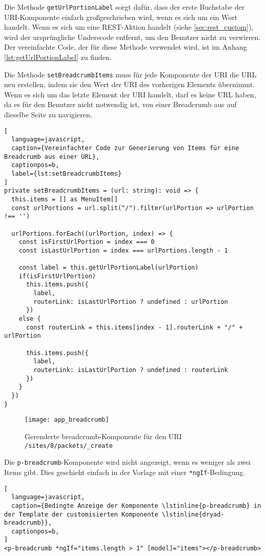 Die Methode \lstinline{getUrlPortionLabel} sorgt dafür, dass der erste Buchstabe der \ac{URI}-Komponente einfach großgeschrieben wird, wenn es sich um ein Wort handelt.
Wenn es sich um eine \ac{REST}-Aktion handelt (siehe \ref{sec:rest_custom}), wird der ursprüngliche Underscode entfernt, um den Benutzer nicht zu verwirren.
Der vereinfachte Code, der für diese Methode verwendet wird, ist im Anhang \ref{lst:getUrlPortionLabel} zu finden.

Die Methode \lstinline{setBreadcrumbItems} muss für jede Komponente der \ac{URI} die \ac{URL} neu erstellen, indem sie den Wert der \ac{URI} des vorherigen Elements übernimmt.
Wenn es sich um das letzte Element der \ac{URI} handelt, darf es keine \ac{URL} haben, da es für den Benutzer nicht notwendig ist, von einer Breadcrumb aus auf dieselbe Seite zu navigieren.

\begin{lstlisting}[
  language=javascript,
  caption={Vereinfachter Code zur Generierung von Items für eine Breadcrumb aus einer URL},
  captionpos=b,
  label={lst:setBreadcrumbItems}
]
private setBreadcrumbItems = (url: string): void => {
  this.items = [] as MenuItem[]
  const urlPortions = url.split("/").filter(urlPortion => urlPortion !== '')

  urlPortions.forEach((urlPortion, index) => {
    const isFirstUrlPortion = index === 0
    const isLastUrlPortion = index === urlPortions.length - 1

    const label = this.getUrlPortionLabel(urlPortion)
    if(isFirstUrlPortion)
      this.items.push({
        label,
        routerLink: isLastUrlPortion ? undefined : urlPortion
      })
    else {
      const routerLink = this.items[index - 1].routerLink + "/" + urlPortion

      this.items.push({
        label,
        routerLink: isLastUrlPortion ? undefined : routerLink
      })
    }
  })
}
\end{lstlisting}

\begin{figure}[H]
  \centering
  \texttt{[image: app\_breadcrumb]}
  \caption{Gerenderte breadcrumb-Komponente für den URI \lstinline{/sites/8/packets/_create}}
  \label{fig:app_breadcrumb}
\end{figure}

Die \lstinline{p-breadcrumb}-Komponente wird nicht angezeigt, wenn es weniger als zwei Items gibt.
Dies geschieht einfach in der Vorlage mit einer \lstinline{*ngIf}-Bedingung.

\begin{lstlisting}[
  language=javascript,
  caption={Bedingte Anzeige der Komponente \lstinline{p-breadcrumb} in der Template der customisierten Komponente \lstinline{dryad-breadcrumb}},
  captionpos=b,
]
<p-breadcrumb *ngIf="items.length > 1" [model]="items"></p-breadcrumb>
\end{lstlisting}
